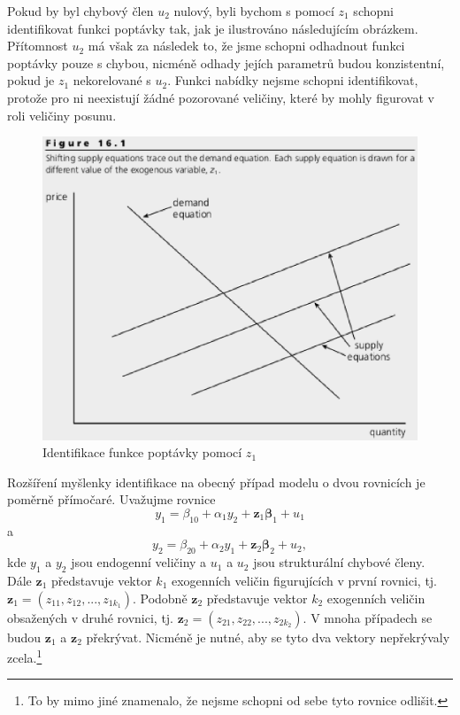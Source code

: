 Pokud by byl chybový člen $u_2$ nulový, byli bychom s pomocí $z_1$ schopni identifikovat funkci poptávky tak, jak je ilustrováno následujícím obrázkem. Přítomnost $u_2$ má však za následek to, že jsme schopni odhadnout funkci poptávky pouze s chybou, nicméně odhady jejích parametrů budou konzistentní, pokud je $z_1$ nekorelované s $u_2$. Funkci nabídky nejsme schopni identifikovat, protože pro ni neexistují žádné pozorované veličiny, které by mohly figurovat v roli veličiny posunu.
\begin{figure}[htp]
\centering
\includegraphics[scale = 0.5]{pictures/figure_16_1.eps}
\caption{Identifikace funkce poptávky pomocí $z_1$}
\label{figure_16_1}
\end{figure}

Rozšíření myšlenky identifikace na obecný případ modelu o dvou rovnicích je poměrně přímočaré. Uvažujme rovnice
\begin{equation}
y_1 = \beta_{10} + \alpha_1 y_2 + \pmb{z}_1 \pmb{\beta}_1 + u_1
\end{equation}
a
\begin{equation}
y_2 = \beta_{20} + \alpha_2 y_1 + \pmb{z}_2 \pmb{\beta}_2 + u_2,
\end{equation}
kde $y_1$ a $y_2$ jsou endogenní veličiny a $u_1$ a $u_2$ jsou strukturální chybové členy. Dále $\pmb{z}_1$ představuje vektor $k_1$ exogenních veličin figurujících v první rovnici, tj. $\pmb{z}_1 = (z_{11}, z_{12}, ..., z_{1 k_1})$. Podobně $\pmb{z}_2$ představuje vektor $k_2$ exogenních veličin obsažených v druhé rovnici, tj. $\pmb{z}_2 = (z_{21}, z_{22}, ..., z_{2 k_2})$. V mnoha případech se budou $\pmb{z}_1$ a $\pmb{z}_2$ překrývat. Nicméně je nutné, aby se tyto dva vektory nepřekrývaly zcela.\footnote{To by mimo jiné znamenalo, že nejsme schopni od sebe tyto rovnice odlišit.}

